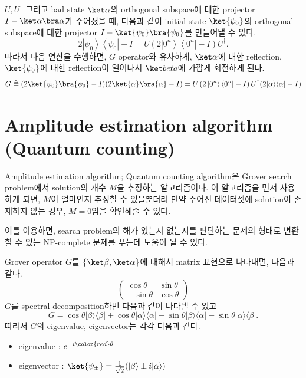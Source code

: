 \vspace{1em}

$U, U^\dagger$ 그리고 bad state $\ket \alpha$의 orthogonal subspace에 대한 projector $I - \ket \alpha \bra \alpha$가 주어졌을 때, 다음과 같이 initial state $\ket{\psi_0}$의 orthogonal subspace에 대한 projector $I - \ket {\psi_0} \bra {\psi_0}$를 만들어낼 수 있다.
\begin{equation*}
2\left|\psi_0\right\rangle\left\langle\psi_0\right|-I=U\left(2\left|0^n\right\rangle\left\langle 0^n\right|-I\right) U^{\dagger} .
\end{equation*}
따라서 다음 연산을 수행하면, $G$ operator와 유사하게, $\ket \alpha$에 대한 reflection, $\ket{\psi_0}$에 대한 reflection이 일어나서 $\ket beta$에 가깝게 회전하게 된다.
\begin{equation*}
  G \triangleq (2\ket{\psi_0}\bra{\psi_0} - I)(2 \ket{\alpha}\bra{\alpha} - I) = U\left(2\left|0^n\right\rangle\left\langle 0^n\right|-I\right) U^{\dagger}(2|\alpha\rangle\langle\alpha|-I)
\end{equation*}

\section{Amplitude estimation algorithm (Quantum counting)}\label{sec:amplitude-estimation}
Amplitude estimation algorithm; Quantum counting algorithm은 Grover search problem에서 solution의 개수 $M$을 추정하는 알고리즘이다.
이 알고리즘을 먼저 사용하게 되면, $M$이 얼마인지 추정할 수 있을뿐더러 만약 주어진 데이터셋에 solution이 존재하지 않는 경우, $M=0$임을 확인해줄 수 있다.

이를 이용하면, search problem의 해가 있는지 없는지를 판단하는 문제의 형태로 변환할 수 있는 NP-complete 문제를 푸는데 도움이 될 수 있다.

\vspace{1em}

Grover operator $G$를 $\{\ket \beta, \ket \alpha\}$에 대해서 matrix 표현으로 나타내면, 다음과 같다.
\begin{equation*}
  \left(\begin{array}{cc}
    \cos \theta & \sin \theta \\
    -\sin \theta & \cos \theta
    \end{array}\right)
\end{equation*}
$G$를 spectral decomposition하면 다음과 같이 나타낼 수 있고
\begin{equation*}
  G=\cos \theta|\beta\rangle\langle\beta|+\cos \theta|\alpha\rangle\langle\alpha|+\sin \theta|\beta\rangle\langle\alpha|-\sin \theta|\alpha\rangle\langle\beta| .
\end{equation*}
따라서 $G$의 eigenvalue, eigenvector는 각각 다음과 같다.
\begin{itemize}
  \item eigenvalue : $e^{\pm i {\color{red} \theta}}$
  \item eigenvector : $\ket{\psi_{\pm}} = \frac{1}{\sqrt{2}}(|\beta\rangle \pm i|\alpha\rangle)$
\end{itemize}

